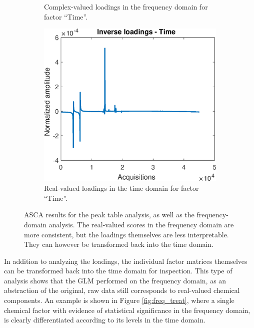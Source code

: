 \documentclass[preprint,12pt]{elsarticle}
\begin{document}
\begin{figure}[hbtp!]
\begin{subfigure}[b]{0.45\textwidth}
        \caption{Complex-valued loadings in the frequency domain for factor ``Time''.}
        \label{fig:figure4}
    \end{subfigure}
    \vfill
    \hfill
    \begin{subfigure}[b]{0.45\textwidth}
        \centering
        \includegraphics[width=\textwidth]{figures/time_peaks.eps}
        \caption{Real-valued loadings in the time domain for factor ``Time''.}
        \label{fig:figure5}
    \end{subfigure}
    \caption{ASCA results for the peak table analysis, as well as the frequency-domain analysis. The real-valued scores in the frequency domain are more consistent, but the loadings themselves are less interpretable. They can however be transformed back into the time domain.}
    \label{fig:subfigures}
    
\end{figure}

In addition to analyzing the loadings, the individual factor matrices themselves can be transformed back into the time domain for  inspection. This type of analysis shows that the GLM performed on the frequency domain, as an abstraction of the original, raw data still corresponds to real-valued chemical components. An example is shown in Figure \ref{fig:freq_treat}, where a single chemical factor with evidence of statistical significance in the frequency domain, is clearly differentiated according to its levels in the time domain.
\end{document}
